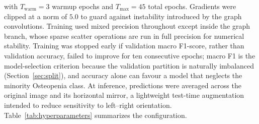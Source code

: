 \documentclass[journal]{IEEEtran}
\begin{document}
with $T_{\text{warm}}=3$ warmup epochs and $T_{\max}=45$ total epochs. Gradients
were clipped at a norm of $5.0$ to guard against instability introduced by the
graph convolutions. Training used mixed precision throughout except inside the
graph branch, whose sparse scatter operations are run in full precision for
numerical stability. Training was stopped early if validation macro F1-score,
rather than validation accuracy, failed to improve for ten consecutive epochs;
macro F1 is the model-selection criterion because the validation partition is
naturally imbalanced (Section~\ref{sec:split}), and accuracy alone can favour a
model that neglects the minority Osteopenia class. At inference, predictions
were averaged across the original image and its horizontal mirror, a lightweight
test-time augmentation intended to reduce sensitivity to left--right
orientation. Table~\ref{tab:hyperparameters} summarizes the configuration.
\end{document}
